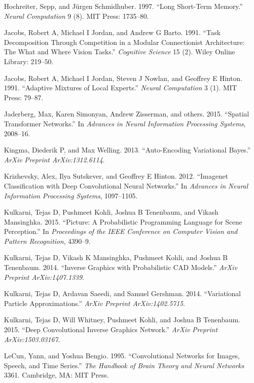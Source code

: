 \documentclass[12pt,twoside]{mitthesis}
\begin{document}
\hypertarget{ref-hochreiter1997long}{}
Hochreiter, Sepp, and Jürgen Schmidhuber. 1997. ``Long Short-Term
Memory.'' \emph{Neural Computation} 9 (8). MIT Press: 1735--80.

\hypertarget{ref-jacobs1991task}{}
Jacobs, Robert A, Michael I Jordan, and Andrew G Barto. 1991. ``Task
Decomposition Through Competition in a Modular Connectionist
Architecture: The What and Where Vision Tasks.'' \emph{Cognitive
Science} 15 (2). Wiley Online Library: 219--50.

\hypertarget{ref-jacobs1991adaptive}{}
Jacobs, Robert A, Michael I Jordan, Steven J Nowlan, and Geoffrey E
Hinton. 1991. ``Adaptive Mixtures of Local Experts.'' \emph{Neural
Computation} 3 (1). MIT Press: 79--87.

\hypertarget{ref-jaderberg2015spatial}{}
Jaderberg, Max, Karen Simonyan, Andrew Zisserman, and others. 2015.
``Spatial Transformer Networks.'' In \emph{Advances in Neural
Information Processing Systems}, 2008--16.

\hypertarget{ref-kingma2013auto}{}
Kingma, Diederik P, and Max Welling. 2013. ``Auto-Encoding Variational
Bayes.'' \emph{ArXiv Preprint ArXiv:1312.6114}.

\hypertarget{ref-krizhevsky2012imagenet}{}
Krizhevsky, Alex, Ilya Sutskever, and Geoffrey E Hinton. 2012.
``Imagenet Classification with Deep Convolutional Neural Networks.'' In
\emph{Advances in Neural Information Processing Systems}, 1097--1105.

\hypertarget{ref-kulkarni2015picture}{}
Kulkarni, Tejas D, Pushmeet Kohli, Joshua B Tenenbaum, and Vikash
Mansinghka. 2015. ``Picture: A Probabilistic Programming Language for
Scene Perception.'' In \emph{Proceedings of the IEEE Conference on
Computer Vision and Pattern Recognition}, 4390--9.

\hypertarget{ref-kulkarni2014inverse}{}
Kulkarni, Tejas D, Vikash K Mansinghka, Pushmeet Kohli, and Joshua B
Tenenbaum. 2014. ``Inverse Graphics with Probabilistic CAD Models.''
\emph{ArXiv Preprint ArXiv:1407.1339}.

\hypertarget{ref-kulkarni2014variational}{}
Kulkarni, Tejas D, Ardavan Saeedi, and Samuel Gershman. 2014.
``Variational Particle Approximations.'' \emph{ArXiv Preprint
ArXiv:1402.5715}.

\hypertarget{ref-kulkarni2015deep}{}
Kulkarni, Tejas D, Will Whitney, Pushmeet Kohli, and Joshua B Tenenbaum.
2015. ``Deep Convolutional Inverse Graphics Network.'' \emph{ArXiv
Preprint ArXiv:1503.03167}.

\hypertarget{ref-lecun1995convolutional}{}
LeCun, Yann, and Yoshua Bengio. 1995. ``Convolutional Networks for
Images, Speech, and Time Series.'' \emph{The Handbook of Brain Theory
and Neural Networks} 3361. Cambridge, MA: MIT Press.
\end{document}
